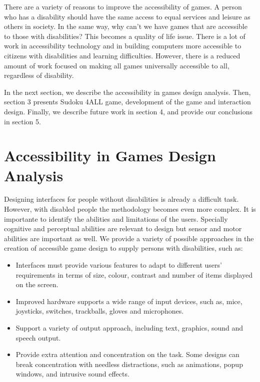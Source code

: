 \documentclass[doublespace,11pt]{article}
\begin{document}
\begin{spacing}{1}
There are a variety of reasons to improve the accessibility of games. A person who has a disability 
should have the same access to equal services and leisure as others in society. In the same 
way, why can't we have games that are accessible to those with disabilities? This becomes a 
quality of life issue. 
There is a lot of work in accessibility technology and in building computers more accessible to 
citizens with disabilities and learning difficulties. However, there is a reduced amount of work 
focused on making all games universally accessible to all, regardless of disability.

In the next section, we describe the accessibility in games design analysis. Then, section 3 presents 
Sudoku 4ALL game, development of the game and 
interaction design. Finally, we describe future work in section 4, and provide our conclusions in section 5.  

\section{Accessibility in Games Design Analysis}

Designing interfaces for people without disabilities is already a difficult task. However, with disabled people 
the methodology becomes even more complex. It is importante to identify the abilities and limitations of the users. 
Specially cognitive and perceptual abilities are relevant to design but 
sensor and motor abilities are important as well.
We provide a variety of possible approaches in the creation of accessible game design to supply persons 
with disabilities, such as:

\begin{itemize}

\item Interfaces must provide various features to adapt to different users' requirements in terms of size, colour, 
contrast and number of items displayed on the screen.

\item Improved hardware supports a wide range of input devices, such as, mice, joysticks, switches, trackballs, 
gloves and microphones.

\item Support a variety of output approach, including text, graphics, sound and speech output.

\item Provide extra attention and concentration on the task. Some designs can break concentration with needless 
distractions, such as animations, popup windows, and intrusive sound effects.


\end{itemize}
\end{spacing}
\end{document}

